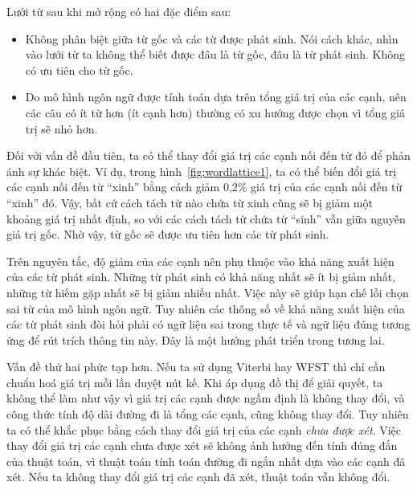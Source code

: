 \documentclass[a4paper,oneside,14pt]{extbook} %
\newcommand{\note}[1]{\underline{#1}}
\begin{document}

Lưới từ sau khi mở rộng có hai đặc điểm sau:
\begin{itemize}
\item Không phân biệt giữa từ gốc và các từ được phát sinh. Nói cách
  khác, nhìn vào lưới từ ta không thể biết được đâu là từ gốc, đâu là
  từ phát sinh. Không có ưu tiên cho từ gốc.
\item Do mô hình ngôn ngữ được tính toán dựa trên tổng giá trị của các
  cạnh, nên các câu có ít từ hơn (ít cạnh hơn) thường có xu hướng được
  chọn vì tổng giá trị sẽ nhỏ hơn.
\end{itemize}

Đối với vấn đề đầu tiên, ta có thể thay đổi giá trị các cạnh nối đến
từ đó để phản ánh sự khác biệt. Ví dụ, trong
hình~\ref{fig:wordlattice1}, ta có thể biến đổi giá trị các cạnh nối
đến từ ``xinh'' bằng cách giảm 0,2\% giá trị của các cạnh nối đến từ
``xinh'' đó. Vậy, bất cứ cách tách từ nào chứa từ xinh cũng sẽ bị giảm
một khoảng giá trị nhất định, so với các cách tách từ chứa từ ``sinh''
vẫn giữa nguyên giá trị gốc. Nhờ vậy, từ gốc sẽ được ưu tiên hơn các
từ phát sinh.

Trên nguyên tắc, độ giảm của các cạnh nên phụ thuộc vào khả năng xuất
hiện của các từ phát sinh. Những từ phát sinh có khả năng nhất sẽ ít
bị giảm nhất, những từ hiếm gặp nhất sẽ bị giảm nhiều nhất. Việc này
sẽ giúp hạn chế lỗi chọn sai từ của mô hình ngôn ngữ. Tuy nhiên các
thông số về khả năng xuất hiện của các từ phát sinh đòi hỏi phải có ngữ
liệu sai trong thực tế và ngữ liệu đúng tương ứng để rút trích thông
tin này. Đây là một hướng phát triển trong tương lai.

Vấn đề thứ hai phức tạp hơn. Nếu ta sử dụng Viterbi hay
WFST thì chỉ cần chuẩn hoá giá trị mỗi lần duyệt nút kế. Khi áp dụng
đồ thị để giải quyết, ta không thể làm như vậy vì giá trị các cạnh
được ngầm định là không thay đổi, và công thức tính độ dài đường đi là
tổng các cạnh, cũng không thay đổi. Tuy nhiên ta có thể khắc phục bằng
cách thay đổi giá trị của các cạnh {\em chưa được xét}. Việc thay đổi
giá trị các cạnh chưa được xét sẽ không ảnh hưởng đến tính đúng đắn
của thuật toán, vì thuật toán tính toán đường đi ngắn nhất dựa vào các
cạnh đã xét. Nếu ta không thay đổi giá trị các cạnh đã xét, thuật toán
vẫn không đổi.
\end{document}
